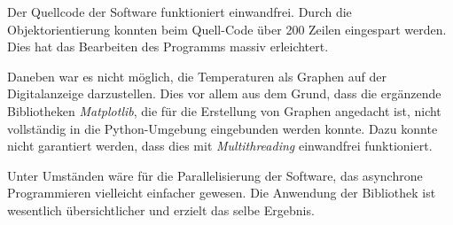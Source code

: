 
Der Quellcode der Software funktioniert einwandfrei. Durch die Objektorientierung konnten beim Quell-Code über 200 Zeilen eingespart werden. Dies hat das Bearbeiten des Programms massiv erleichtert.


Daneben war es nicht möglich, die Temperaturen als Graphen auf der Digitalanzeige darzustellen. Dies vor allem aus dem Grund, dass die ergänzende Bibliotheken \textit{Matplotlib}, die für die Erstellung von Graphen angedacht ist, nicht vollständig in die Python-Umgebung eingebunden werden konnte. Dazu konnte nicht garantiert werden, dass dies mit \textit{Multithreading} einwandfrei funktioniert.

 Unter Umständen wäre für die Parallelisierung der Software, das asynchrone Programmieren vielleicht einfacher gewesen. Die Anwendung der Bibliothek ist wesentlich übersichtlicher und erzielt das selbe Ergebnis.\\

